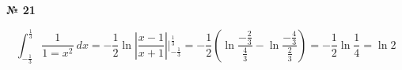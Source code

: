 \documentclass{article}
\begin{document}
\textbf{№ 21} 
\large

$$ \int_{-\frac{1}{3}}^{\frac{1}{3}} \frac{1}{1=x^2} \ dx 
= -\frac{1}{2} \ln{\left| \frac{x-1}{x+1} \right|} \bigg\vert_{-\frac{1}{3}}^{\frac{1}{3}} 
= -\frac{1}{2} \left( \ln{\frac{-\frac{2}{3}}{\frac{4}{3}}} - \ln{\frac{-\frac{4}{3}}{\frac{2}{3}}} \right)
= -\frac{1}{2} \ln{\frac{1}{4}}
= \ln{2} $$
\end{document}
